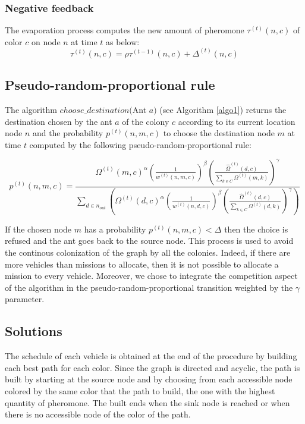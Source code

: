 \documentclass[a4paper,12pt]{article}
\begin{document}
\subsubsection{Negative feedback}
The evaporation process computes the new amount of pheromone $\tau^{(t)}(n,c)$ of color $c$ on node $n$ at time $t$ as below:
\begin{equation*}
 \tau^{(t)}(n,c) = \rho \tau^{(t-1)}(n,c) + \Delta^{(t)}(n,c)
\end{equation*}

\subsection{Pseudo-random-proportional rule}
The algorithm $choose\_destination($Ant $a)$ (see Algorithm \ref{algo1}) returns the destination chosen by the ant $a$ of the colony $c$ according to its current location node $n$ and the probability $p^{(t)}(n,m,c)$ to choose the destination node $m$ at time $t$ computed by the following pseudo-random-proportional rule:

\begin{equation*}
  p^{(t)}(n,m,c) = \frac
    {
      \Omega^{(t)}(m,c)^{\alpha}
      \left( \frac{1}{w^{(t)}(n,m,c)} \right) ^{\beta}
      \left( \frac{\hat \Omega^{(t)}(d,c)}{\sum_{k \in C} \Omega^{(t)}(m,k)} \right)^{\gamma}
    }
    {
      \sum_{d \in n_{out}} \left(
	\Omega^{(t)}(d,c)^{\alpha}
	\left( \frac{1}{w^{(t)}(n,d,c)} \right)^{\beta}
	\left( \frac{\hat \Omega^{(t)}(d,c)}{\sum_{k \in C} \Omega^{(t)}(d,k)} \right)^{\gamma}
      \right)
    }
\end{equation*}

If the chosen node $m$ has a probability $p^{(t)}(n,m,c) < \Delta$ then the choice is refused and the ant goes back to the source node. This process is used to avoid the continous colonization of the graph by all the colonies. Indeed, if there are more vehicles than missions to allocate, then it is not possible to allocate a mission to every vehicle. Moreover, we chose to integrate the competition aspect of the algorithm in the pseudo-random-proportional transition weighted by the $\gamma$ parameter.

\subsection{Solutions}
The schedule of each vehicle is obtained at the end of the procedure by building each best path for each color. Since the graph is directed and acyclic, the path is built by starting at the source node and by choosing from each accessible node colored by the same color that the path to build, the one with the highest quantity of pheromone. The built ends when the sink node is reached or when there is no accessible node of the color of the path.
\end{document}
